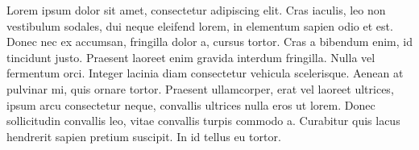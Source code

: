 Lorem ipsum dolor sit amet, consectetur adipiscing elit. Cras
iaculis, leo non vestibulum sodales, dui neque eleifend lorem, in
elementum sapien odio et est. Donec nec ex accumsan, fringilla
dolor a, cursus tortor. Cras a bibendum enim, id tincidunt justo.
Praesent laoreet enim gravida interdum fringilla. Nulla vel
fermentum orci. Integer lacinia diam consectetur vehicula
scelerisque. Aenean at pulvinar mi, quis ornare tortor. Praesent
ullamcorper, erat vel laoreet ultrices, ipsum arcu consectetur
neque, convallis ultrices nulla eros ut lorem. Donec sollicitudin
convallis leo, vitae convallis turpis commodo a. Curabitur quis
lacus hendrerit sapien pretium suscipit. In id tellus eu tortor. 
